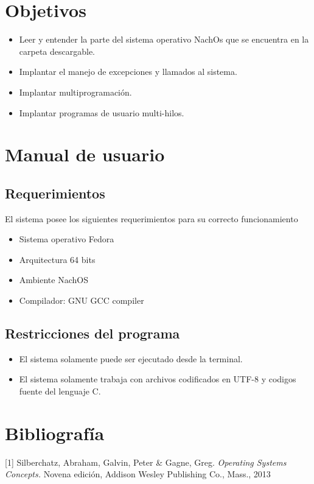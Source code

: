 \documentclass[12pt]{article}
\begin{document}


\section[Objetivos]{Objetivos}
\begin{itemize}
  \item    Leer y entender la parte del sistema operativo NachOs que se encuentra en la carpeta descargable.
  \item    Implantar el manejo de excepciones y llamados al sistema. 
  \item    Implantar multiprogramación. 
  \item    Implantar programas de usuario multi-hilos.
\end{itemize}








\newpage
\section[Manual de usuario]{Manual de usuario}
\subsection{Requerimientos}
El sistema posee los siguientes requerimientos para su correcto funcionamiento
\begin{itemize}
  \item Sistema operativo Fedora
  \item Arquitectura 64 bits
  \item Ambiente NachOS 
  \item Compilador: GNU GCC compiler
\end{itemize}

\subsection[Restricciones]{Restricciones del programa}
\begin{itemize}
  \item El sistema solamente puede ser ejecutado desde la terminal.
  \item El sistema solamente trabaja con archivos codificados en UTF-8 y codigos fuente del lenguaje C. 
  \end{itemize}
\newpage


\section{Bibliografía}

[1] Silberchatz, Abraham, Galvin, Peter \& Gagne, Greg. {\em  Operating Systems Concepts.} Novena edición, Addison Wesley Publishing Co., Mass., 2013 
\end{document}
